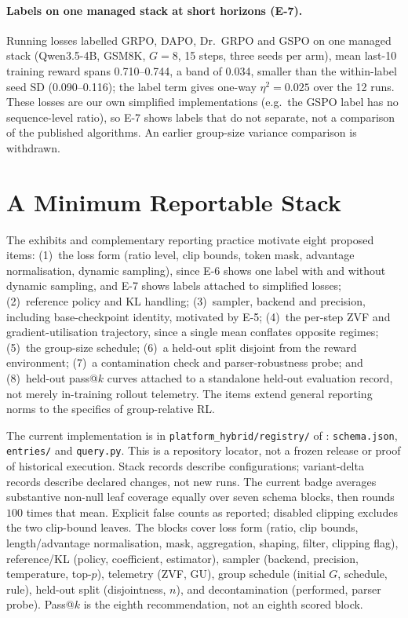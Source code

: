 \paragraph{Labels on one managed stack at short horizons (E-7).}
Running losses labelled GRPO, DAPO, Dr.\ GRPO and GSPO on one managed stack
(Qwen3.5-4B, GSM8K, $G=8$, 15 steps, three seeds per arm), mean last-10
training reward spans 0.710--0.744, a band of 0.034, smaller than the
within-label seed SD (0.090--0.116); the label term gives one-way
$\eta^2=0.025$ over the 12 runs. These losses are our own simplified
implementations (e.g.\ the GSPO label has no sequence-level ratio), so E-7
shows labels that do not separate, not a comparison of the published
algorithms. An earlier group-size variance comparison is withdrawn.

\section{A Minimum Reportable Stack}

The exhibits and complementary reporting practice motivate eight proposed
items: (1)~the loss form (ratio level, clip
bounds, token mask, advantage normalisation, dynamic sampling), since E-6
shows one label with and without dynamic sampling, and E-7 shows labels
attached to simplified losses; (2)~reference policy and
KL handling; (3)~sampler, backend and precision, including base-checkpoint
identity, motivated by E-5; (4)~the per-step ZVF and gradient-utilisation
trajectory, since a single mean conflates opposite regimes; (5)~the
group-size schedule; (6)~a held-out split disjoint from the reward
environment; (7)~a contamination check and parser-robustness probe; and
(8)~held-out pass@$k$ curves attached to a standalone held-out evaluation record,
not merely in-training rollout telemetry.
The items extend general reporting norms
\citep{pineau2020improving,mitchell2019modelcards,gebru2021datasheets} to the
specifics of group-relative RL.

The current implementation is in \texttt{platform\_hybrid/registry/}
of \repolocator: \texttt{schema.json},
\texttt{entries/} and \texttt{query.py}. This is a repository locator, not
a frozen release or proof of historical execution. Stack records describe
configurations; variant-delta records describe declared changes, not new runs.
The current badge averages substantive non-null leaf coverage equally over
seven schema blocks, then rounds $100$ times that mean. Explicit false counts
as reported; disabled clipping excludes the two clip-bound leaves.
The blocks cover loss form (ratio, clip bounds, length/advantage normalisation,
mask, aggregation, shaping, filter, clipping flag), reference/KL (policy,
coefficient, estimator), sampler (backend, precision, temperature, top-$p$),
telemetry (ZVF, GU), group schedule (initial $G$, schedule, rule), held-out
split (disjointness, $n$), and decontamination (performed, parser probe).
Pass@$k$ is the eighth recommendation, not an eighth scored block.

